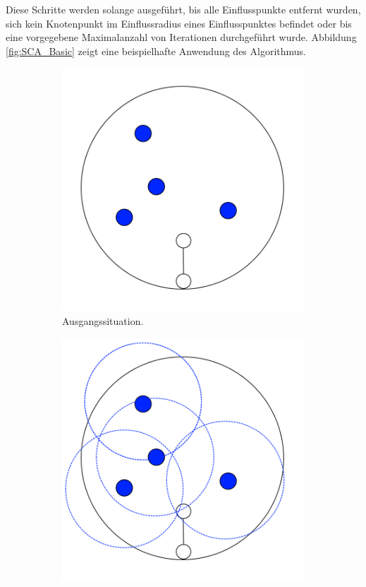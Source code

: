 Diese Schritte werden solange ausgeführt, bis alle Einflusspunkte entfernt wurden, sich kein Knotenpunkt im Einflussradius eines Einflusspunktes befindet oder bis eine vorgegebene Maximalanzahl von Iterationen durchgeführt wurde. Abbildung \ref{fig:SCA_Basic} zeigt eine beispielhafte Anwendung des Algorithmus.

\begin{figure} [hbtp]
	\centering
	\begin{subfigure}[t]{.3\textwidth}
		\centering
		\includegraphics[width=\linewidth]{images/SCA_Basic1.png}
		\caption{ Ausgangssituation. }
		\label{subfig:SCA_Basic1}
	\end{subfigure}
	\hspace{.03\textwidth}
	\begin{subfigure}[t]{.3\textwidth}
		\centering
		\includegraphics[width=\linewidth]{images/SCA_Basic2.png}

\end{subfigure}
\end{figure}
